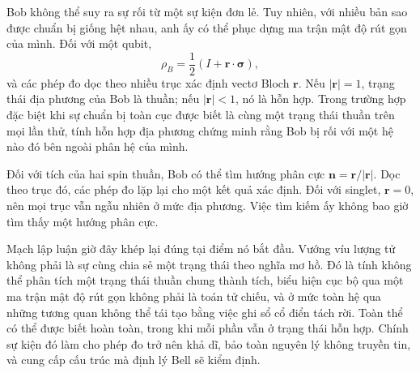Bob không thể suy ra sự rối từ một sự kiện đơn lẻ. Tuy nhiên, với nhiều bản sao được chuẩn bị giống hệt nhau, anh ấy có thể phục dựng ma trận mật độ rút gọn của mình. Đối với một qubit,
\begin{equation}
\rho_B
=\frac12\left(
I+\mathbf r\cdot\boldsymbol{\sigma}
\right),
\label{eq:l7-bloch-density}
\end{equation}
và các phép đo dọc theo nhiều trục xác định vectơ Bloch \(\mathbf r\). Nếu \(|\mathbf r|=1\), trạng thái địa phương của Bob là thuần; nếu \(|\mathbf r|<1\), nó là hỗn hợp. Trong trường hợp đặc biệt khi sự chuẩn bị toàn cục được biết là cùng một trạng thái thuần trên mọi lần thử, tính hỗn hợp địa phương chứng minh rằng Bob bị rối với một hệ nào đó bên ngoài phân hệ của mình.

Đối với tích của hai spin thuần, Bob có thể tìm hướng phân cực \(\mathbf n=\mathbf r/|\mathbf r|\). Dọc theo trục đó, các phép đo lặp lại cho một kết quả xác định. Đối với singlet, \(\mathbf r=0\), nên mọi trục vẫn ngẫu nhiên ở mức địa phương. Việc tìm kiếm ấy không bao giờ tìm thấy một hướng phân cực.

\begin{classroomqa}
\end{classroomqa}

\begin{classroomqa}
\end{classroomqa}

Mạch lập luận giờ đây khép lại đúng tại điểm nó bắt đầu. Vướng víu lượng tử không phải là sự cùng chia sẻ một trạng thái theo nghĩa mơ hồ. Đó là tính không thể phân tích một trạng thái thuần chung thành tích, biểu hiện cục bộ qua một ma trận mật độ rút gọn không phải là toán tử chiếu, và ở mức toàn hệ qua những tương quan không thể tái tạo bằng việc ghi sổ cổ điển tách rời. Toàn thể có thể được biết hoàn toàn, trong khi mỗi phần vẫn ở trạng thái hỗn hợp. Chính sự kiện đó làm cho phép đo trở nên khả dĩ, bảo toàn nguyên lý không truyền tin, và cung cấp cấu trúc mà định lý Bell sẽ kiểm định.

